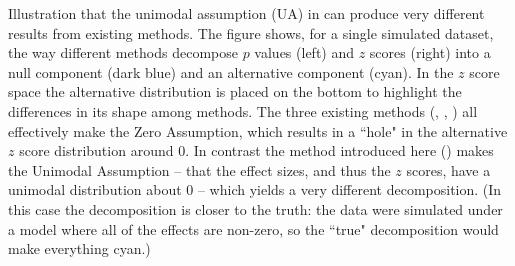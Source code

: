 \label{fig:ZA} Illustration that the unimodal assumption (UA) in \ashr can produce very different results from existing methods.
The figure shows, for a single simulated dataset, the way different methods decompose $p$ values (left) and $z$ scores (right) into a null component (dark blue) and an alternative component (cyan). In the $z$ score space the alternative distribution is placed on the bottom to highlight the differences in its shape among methods.
The three existing methods (\qvalue, \locfdr, \mixfdr) all effectively make the Zero Assumption, which results in a ``hole" in the alternative $z$ score distribution around 0.
In contrast the method introduced here (\ashr) makes the Unimodal Assumption -- that the effect sizes, and thus the $z$ scores, have a unimodal distribution about 0 -- which yields a very different decomposition. (In this case the \ashr decomposition is closer to the truth: the data were simulated under a model where all of the effects are non-zero, so the ``true" decomposition would make everything cyan.)